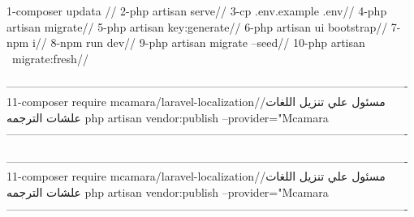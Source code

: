 1-composer updata //
2-php artisan serve//
3-cp .env.example .env//
4-php artisan migrate//
5-php artisan key:generate//
6-php artisan ui bootstrap//
7-npm i//
8-npm run dev//
9-php artisan migrate --seed//
10-php artisan  migrate:fresh//

----------------------------------------------------------------------------------------------------------
11-composer require mcamara/laravel-localization//مسئول علي تنزيل اللغات علشات الترجمه 
php artisan vendor:publish --provider="Mcamara\LaravelLocalization\LaravelLocalizationServiceProvider
----------------------------------------------------------------------------------------------------------

----------------------------------------------------------------------------------------------------------
11-composer require mcamara/laravel-localization//مسئول علي تنزيل اللغات علشات الترجمه 
php artisan vendor:publish --provider="Mcamara\LaravelLocalization\LaravelLocalizationServiceProvider
----------------------------------------------------------------------------------------------------------
